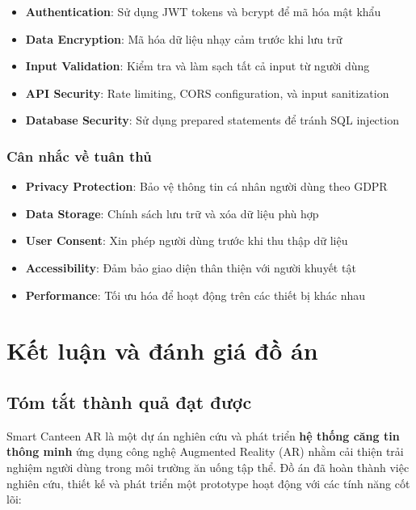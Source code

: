 \documentclass[12pt,a4paper]{article}
\begin{document}
\begin{itemize}[leftmargin=1cm]
    \item \textbf{Authentication}: Sử dụng JWT tokens và bcrypt để mã hóa mật khẩu
    \item \textbf{Data Encryption}: Mã hóa dữ liệu nhạy cảm trước khi lưu trữ
    \item \textbf{Input Validation}: Kiểm tra và làm sạch tất cả input từ người dùng
    \item \textbf{API Security}: Rate limiting, CORS configuration, và input sanitization
    \item \textbf{Database Security}: Sử dụng prepared statements để tránh SQL injection
\end{itemize}

\subsubsection{Cân nhắc về tuân thủ}

\begin{itemize}[leftmargin=1cm]
    \item \textbf{Privacy Protection}: Bảo vệ thông tin cá nhân người dùng theo GDPR
    \item \textbf{Data Storage}: Chính sách lưu trữ và xóa dữ liệu phù hợp
    \item \textbf{User Consent}: Xin phép người dùng trước khi thu thập dữ liệu
    \item \textbf{Accessibility}: Đảm bảo giao diện thân thiện với người khuyết tật
    \item \textbf{Performance}: Tối ưu hóa để hoạt động trên các thiết bị khác nhau
\end{itemize}

\section{Kết luận và đánh giá đồ án}

\subsection{Tóm tắt thành quả đạt được}

Smart Canteen AR là một dự án nghiên cứu và phát triển \textbf{hệ thống căng tin thông minh} ứng dụng công nghệ Augmented Reality (AR) nhằm cải thiện trải nghiệm người dùng trong môi trường ăn uống tập thể. Đồ án đã hoàn thành việc nghiên cứu, thiết kế và phát triển một prototype hoạt động với các tính năng cốt lõi:
\end{document}
